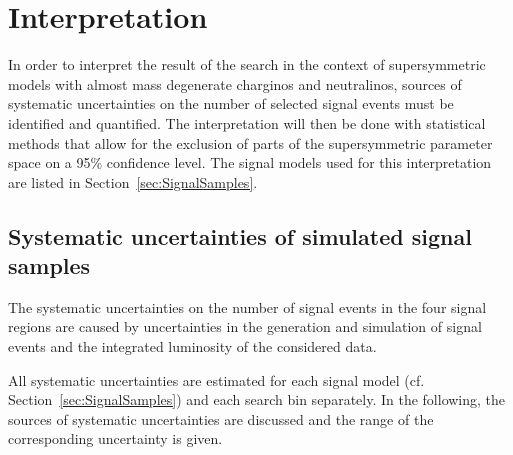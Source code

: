 
\FloatBarrier
\chapter{Interpretation}
\label{sec:Interpretation}
In order to interpret the result of the search in the context of supersymmetric models with almost mass degenerate charginos and neutralinos, sources of systematic uncertainties on the number of selected signal events must be identified and quantified.
The interpretation will then be done with statistical methods that allow for the exclusion of parts of the supersymmetric parameter space on a 95\% confidence level.
The signal models used for this interpretation are listed in Section~\ref{sec:SignalSamples}.

\section{Systematic uncertainties of simulated signal samples}
The systematic uncertainties on the number of signal events in the four signal regions are caused by uncertainties in the generation and simulation of signal events and the integrated luminosity of the considered data.

All systematic uncertainties are estimated for each signal model (cf. Section~\ref{sec:SignalSamples}) and each search bin separately.
In the following, the sources of systematic uncertainties are discussed and the range of the corresponding uncertainty is given.

